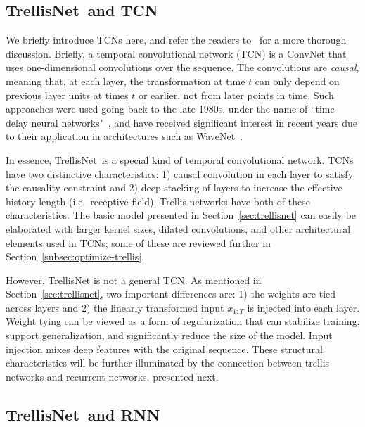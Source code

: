 \documentclass{article} \usepackage{iclr2019_conference,times}
\newcommand{\model}{TrellisNet}
\begin{document}
\subsection{\model~and TCN}
\label{subsec:trellis-tcn}

We briefly introduce TCNs here, and refer the readers to~\cite{bai2018empirical} for a more thorough discussion. Briefly, a temporal convolutional network (TCN) is a ConvNet that uses one-dimensional convolutions over the sequence. The convolutions are \emph{causal}, meaning that, at each layer, the transformation at time $t$ can only depend on previous layer units at times $t$ or earlier, not from later points in time. Such approaches were used going back to the late 1980s, under the name of ``time-delay neural networks"~\citep{waibel}, and have received significant interest in recent years due to their application in architectures such as WaveNet~\citep{waveNet}.

In essence, \model~is a special kind of temporal convolutional network. TCNs have two distinctive characteristics: 1) causal convolution in each layer to satisfy the causality constraint and 2) deep stacking of layers to increase the effective history length (i.e.\ receptive field). Trellis networks have both of these characteristics. The basic model presented in Section~\ref{sec:trellisnet} can easily be elaborated with larger kernel sizes, dilated convolutions, and other architectural elements used in TCNs; some of these are reviewed further in Section~\ref{subsec:optimize-trellis}.

However, TrellisNet is not a general TCN. As mentioned in Section~\ref{sec:trellisnet}, two important differences are: 1) the weights are tied across layers and 2) the linearly transformed input $\tilde{x}_{1:T}$ is injected into each layer. Weight tying can be viewed as a form of regularization that can stabilize training, support generalization, and significantly reduce the size of the model. Input injection mixes deep features with the original sequence. These structural characteristics will be further illuminated by the connection between trellis networks and recurrent networks, presented next.

\subsection{\model~and RNN}
\label{subsec:trellis-rnn}
\end{document}
